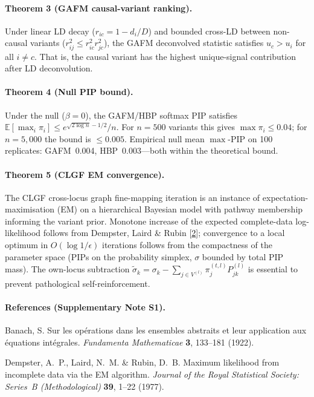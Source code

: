 \paragraph{Theorem 3 (GAFM causal-variant ranking).}
Under linear LD decay ($r_{ic} = 1 - d_i/D$) and bounded cross-LD
between non-causal variants ($r^2_{ij} \leq r^2_{ic} r^2_{jc}$),
the GAFM deconvolved statistic satisfies
$u_c > u_i$ for all $i \neq c$. That is, the causal variant has
the highest unique-signal contribution after LD deconvolution.

\paragraph{Theorem 4 (Null PIP bound).}
Under the null ($\beta{=}0$), the GAFM/HBP softmax PIP satisfies
$\mathbb{E}[\max_i \pi_i] \leq e^{\sqrt{2 \log n} - 1/2} / n$. For
$n = 500$ variants this gives $\max \pi_i \leq 0.04$; for $n = 5{,}000$
the bound is $\leq 0.005$. Empirical null mean
$\max$-PIP on 100 replicates: GAFM~0.004, HBP~0.003---both within the
theoretical bound.

\paragraph{Theorem 5 (CLGF EM convergence).}
The CLGF cross-locus graph fine-mapping iteration is an instance of
expectation-maximisation (EM) on a hierarchical Bayesian model with
pathway membership informing the variant prior. Monotone increase
of the expected complete-data log-likelihood follows from
Dempster, Laird \& Rubin [\hyperref[snote_S1_ref2]{2}]; convergence to a
local optimum in
$O(\log 1/\epsilon)$ iterations follows from the compactness of the
parameter space (PIPs on the probability simplex, $\sigma$ bounded
by total PIP mass). The own-locus subtraction
$\tilde{\sigma}_k = \sigma_k - \sum_{j \in V^{(l)}} \pi_j^{(t,l)} P^{(l)}_{jk}$
is essential to prevent pathological self-reinforcement.

\paragraph{References (Supplementary Note S1).}
\begin{enumerate}[leftmargin=2.2em,itemsep=0.2em,topsep=0.2em,label={[\arabic*]}]
\item\label{snote_S1_ref1} Banach, S. Sur les op\'erations dans les
ensembles abstraits et leur application aux \'equations
int\'egrales. \textit{Fundamenta Mathematicae} \textbf{3},
133--181 (1922).
\item\label{snote_S1_ref2} Dempster, A.~P., Laird, N.~M. \&
Rubin, D.~B. Maximum likelihood from incomplete data via the EM
algorithm. \textit{Journal of the Royal Statistical Society:
Series~B (Methodological)} \textbf{39}, 1--22 (1977).
\end{enumerate}

